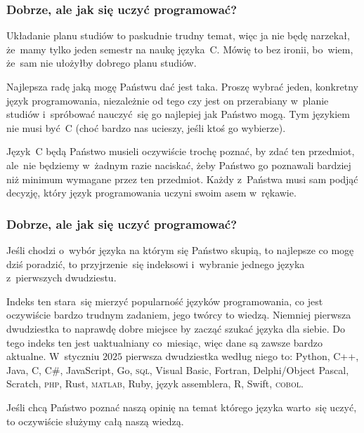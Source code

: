 \documentclass[10pt,t]{beamer}
\begin{document}
\begin{frame}
  \frametitle{Dobrze, ale jak się uczyć programować?}


  Układanie planu studiów to paskudnie trudny temat, więc ja nie będę
  narzekał, że~mamy tylko jeden semestr na naukę języka~C. Mówię to bez
  ironii, bo~wiem, że~sam nie ułożyłby dobrego planu studiów.

  Najlepsza radę jaką mogę Państwu dać jest taka. Proszę wybrać jeden,
  konkretny język programowania, niezależnie od tego czy jest on przerabiany
  w~planie studiów i~spróbować nauczyć~się go najlepiej jak Państwo mogą.
  Tym językiem nie musi być~C (choć bardzo nas ucieszy, jeśli ktoś go
  wybierze).

  Język~C będą Państwo musieli oczywiście trochę poznać, by zdać ten
  przedmiot, ale~nie będziemy w~żadnym razie naciskać, żeby Państwo
  go poznawali bardziej niż minimum wymagane przez ten przedmiot. Każdy
  z~Państwa musi sam podjąć decyzję, który język programowania uczyni swoim
  asem w~rękawie.

\end{frame}





\begin{frame}
  \frametitle{Dobrze, ale jak się uczyć programować?}


  Jeśli chodzi o~wybór języka na którym się Państwo skupią, to najlepsze co
  mogę dziś poradzić, to przyjrzenie~się indeksowi
  i~wybranie jednego języka z~pierwszych dwudziestu.

  Indeks ten stara~się mierzyć popularność języków programowania, co jest
  oczywiście bardzo trudnym zadaniem, jego twórcy to wiedzą. Niemniej
  pierwsza dwudziestka to naprawdę dobre miejsce by zacząć
  szukać języka dla siebie. Do tego indeks ten jest uaktualniany
  co~miesiąc, więc dane są zawsze bardzo aktualne. W~styczniu $2025$
  pierwsza dwudziestka według niego to: Python, C++, Java, C, C\#,
  JavaScript, Go, \textsc{sql}, Visual Basic, Fortran, Delphi/Object Pascal,
  Scratch, \textsc{php}, Rust, \textsc{matlab}, Ruby, język assemblera,
  R, Swift, \textsc{cobol}.

  Jeśli chcą Państwo poznać naszą opinię na temat którego języka warto~się
  uczyć, to oczywiście służymy całą naszą wiedzą.

\end{frame}
\end{document}
